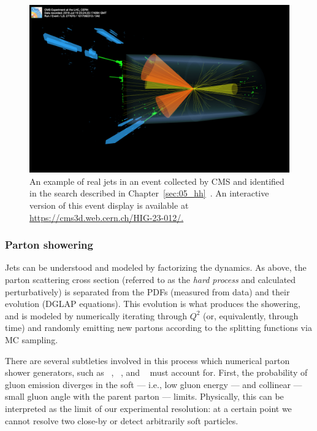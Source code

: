 \begin{figure}[ht]
	\centering
	\includegraphics[width=\textwidth]{figures/01-SM-03-SM/qcd/bbww_event.png}
	\caption{An example of real jets in an event collected by CMS and identified in the search described in Chapter~\ref{sec:05_hh}~\cite{Bauerdick:2011zz, CMS:2024les}.
	An interactive version of this event display is available at \url{https://cms3d.web.cern.ch/HIG-23-012/.}}
	\label{fig:01_sm_qcd_jet_event}
\end{figure}


\subsubsection{Parton showering}

Jets can be understood and modeled by factorizing the dynamics.
As above, the parton scattering cross section (referred to as the \textit{hard process} and calculated perturbatively) is separated from the PDFs (measured from data) and their evolution (DGLAP equations).
This evolution is what produces the showering, and is modeled by numerically iterating through $Q^2$ (or, equivalently, through time) and randomly emitting new partons according to the splitting functions via MC sampling.

There are several subtleties involved in this process which numerical parton shower generators, such as \PYTHIA~\cite{Sjostrand:2014zea}, \HERWIG~\cite{Corcella:2000bw}, and \SHERPA~\cite{Sherpa:2019gpd} must account for.
First, the probability of gluon emission diverges in the soft --- i.e., low gluon energy --- and collinear --- small gluon angle with the parent parton --- limits.
Physically, this can be interpreted as the limit of our experimental resolution: at a certain point we cannot resolve two close-by or detect arbitrarily soft particles.


